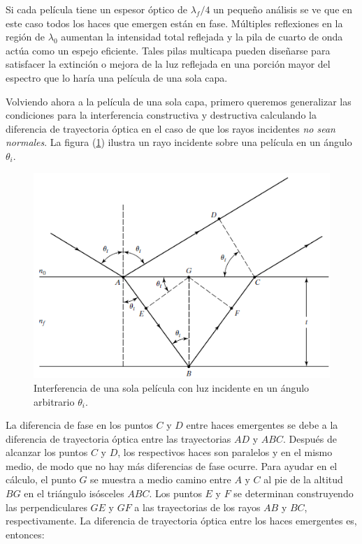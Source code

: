 \documentclass[14pt]{extarticle}
\begin{document}
Si cada película tiene un espesor óptico de $\lambda_{f}/4$ un pequeño análisis se ve que en este caso todos los haces que emergen están en fase. Múltiples reflexiones en la región de $\lambda_{0}$ aumentan la intensidad total reflejada y la pila de cuarto de onda actúa como un espejo eficiente. Tales pilas multicapa pueden diseñarse para satisfacer la extinción o mejora de la luz reflejada en una porción mayor del espectro que lo haría una película de una sola capa.
\par
Volviendo ahora a la película de una sola capa, primero queremos generalizar las condiciones para la interferencia constructiva y destructiva calculando la diferencia de trayectoria óptica en el caso de que los rayos incidentes \textit{no sean normales}. La figura (\ref{fig:figura_07_12}) ilustra un rayo incidente sobre una película en un ángulo $\theta_{i}$.
\begin{figure}[H]
    \centering
    \includegraphics[scale=0.8]{Imagenes/Interferencia2_09.png}
    \caption{Interferencia de una sola película con luz incidente en un ángulo arbitrario $\theta_{i}$.}
    \label{fig:figura_07_12}
\end{figure}
La diferencia de fase en los puntos $C$ y $D$ entre haces emergentes se debe a la diferencia de trayectoria óptica entre las trayectorias $AD$ y $ABC$. Después de alcanzar los puntos $C$ y $D$, los respectivos haces son paralelos y en el mismo medio, de modo que no hay más diferencias de fase ocurre. Para ayudar en el cálculo, el punto $G$ se muestra a medio camino entre $A$ y $C$ al pie de la altitud $BG$ en el triángulo isósceles $ABC$. Los puntos $E$ y $F$ se determinan construyendo las perpendiculares $GE$ y $GF$ a las trayectorias de los rayos $AB$ y $BC$, respectivamente. La diferencia de trayectoria óptica entre los haces emergentes es, entonces:
\end{document}
